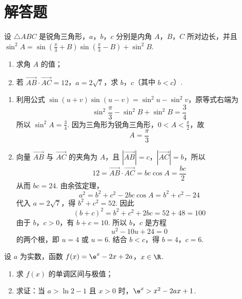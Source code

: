 \section{解答题}

\begin{problem}
设 \(\triangle ABC\) 是锐角三角形，\(a\)，\(b\)，\(c\) 分别是内角 \(A\)，\(B\)，\(C\) 所对边长，并且 \(\sin^{2} A = \sin \left(\frac{\pi}{3} + B\right) \sin \left(\frac{\pi}{3} - B\right) + \sin^{2} B\).

\begin{enumerate}
\item 求角 \(A\) 的值；
\item 若 \(\overrightarrow{AB} \cdot \overrightarrow{AC} = 12\)，\(a = 2 \sqrt{7}\)，求 \(b\)，\(c\)（其中 \(b < c\)）.
\end{enumerate}
\end{problem}

\begin{solution}
\begin{enumerate}
\item 利用公式 \(\sin(u+v)\sin(u-v)=\sin^2u-\sin^2v\)，原等式右端为
\[
\sin^2\frac{\pi}{3}-\sin^2B+\sin^2B=\frac{3}{4}
\]
所以 \(\sin^2A=\frac{3}{4}\). 因为三角形为锐角三角形，\(0<A<\frac{\pi}{2}\)，故
\[
A=\frac{\pi}{3}
\]
\item 向量 \(\overrightarrow{AB}\) 与 \(\overrightarrow{AC}\) 的夹角为 \(A\)，且 \(|\overrightarrow{AB}|=c\)，\(|\overrightarrow{AC}|=b\)，所以
\[
12=\overrightarrow{AB}\cdot\overrightarrow{AC}=bc\cos A=\frac{bc}{2}
\]
从而 \(bc=24\). 由余弦定理，
\[
a^2=b^2+c^2-2bc\cos A=b^2+c^2-24
\]
代入 \(a=2\sqrt7\)，得 \(b^2+c^2=52\). 因此
\[
(b+c)^2=b^2+c^2+2bc=52+48=100
\]
由于 \(b\)，\(c>0\)，有 \(b+c=10\). 所以 \(b\)，\(c\) 是方程
\[
u^2-10u+24=0
\]
的两个根，即 \(u=4\) 或 \(u=6\). 结合 \(b<c\)，得 \(b=4\)，\(c=6\).
\end{enumerate}
\end{solution}

\begin{problem}
设 \(a\) 为实数，函数 \(f(x) = \e^{x} - 2x + 2a\)，\(x \in \R\).

\begin{enumerate}
\item 求 \(f(x)\) 的单调区间与极值；
\item 求证：当 \(a > \ln 2 - 1\) 且 \(x > 0\) 时，\(\e^{x} > x^{2} - 2ax + 1\).
\end{enumerate}
\end{problem}

